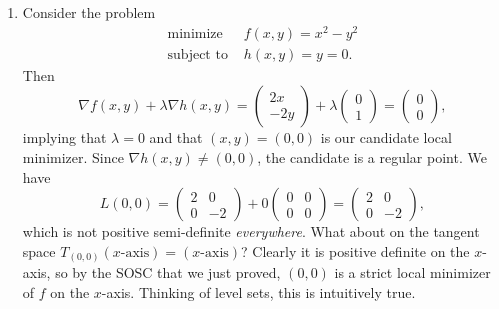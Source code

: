 \documentclass[11pt]{book}
\begin{document}
\begin{enumerate}
\item
Consider the problem
\begin{align*}
\text{minimize } &f(x,y) = x^2-y^2 \\
\text{subject to } &h(x,y) = y = 0.
\end{align*}
Then
\[
\nabla f(x,y) + \lambda \nabla h(x,y) = \begin{pmatrix}
2x \\ -2y
\end{pmatrix} + \lambda \begin{pmatrix}
0 \\ 1
\end{pmatrix} = \begin{pmatrix}
0 \\ 0
\end{pmatrix},
\]
implying that $\lambda = 0$ and that $(x,y) = (0,0)$ is our candidate local minimizer. Since $\nabla h(x,y) \neq (0,0)$, the candidate is a regular point. We have
\[
L(0,0) = \begin{pmatrix}
2 & 0 \\ 0 & -2
\end{pmatrix} + 0 \begin{pmatrix}
0 & 0 \\ 0 & 0
\end{pmatrix} = \begin{pmatrix}
2 & 0 \\ 0 & -2
\end{pmatrix},
\]
which is not positive semi-definite \emph{everywhere}. What about on the tangent space $T_{(0,0)}(\text{$x$-axis})=(\text{$x$-axis})$? Clearly it is positive definite on the $x$-axis, so by the SOSC that we just proved, $(0,0)$ is a strict local minimizer of $f$ on the $x$-axis. Thinking of level sets, this is intuitively true.


\end{enumerate}
\end{document}
